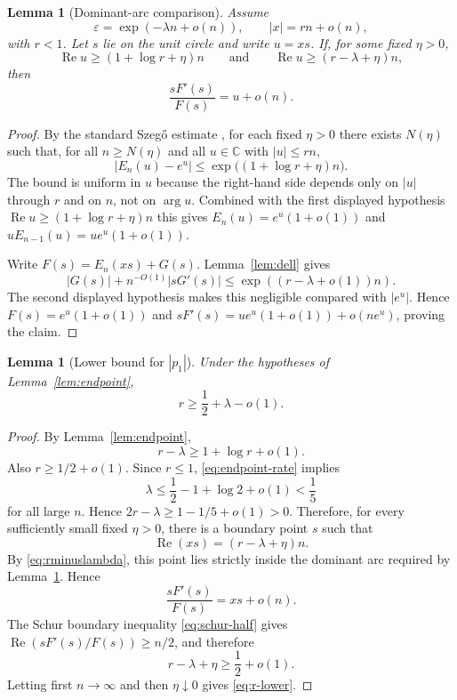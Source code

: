 \documentclass[11pt]{article}
\newtheorem{lemma}[theorem]{Lemma}
\newcommand{\C}{\mathbb{C}}
\newcommand{\eps}{\varepsilon}
\DeclareMathOperator{\Repart}{Re}
\begin{document}
\begin{lemma}[Dominant-arc comparison]\label{lem:dominant}
Assume
\[
        \eps=\exp(-\lambda n+o(n)),
        \qquad |x|=rn+o(n),
\]
with $r<1$.  Let $s$ lie on the unit circle and write $u=xs$.  If, for some
fixed $\eta>0$,
\[
        \Repart u\geq (1+\log r+\eta)n
        \qquad\text{and}\qquad
        \Repart u\geq (r-\lambda+\eta)n,
\]
then
\[
        \frac{sF'(s)}{F(s)}=u+o(n).
\]
\end{lemma}

\begin{proof}
By the standard Szeg\H{o} estimate \cite{Szego}, for each fixed $\eta>0$
there exists $N(\eta)$ such that, for all $n\geq N(\eta)$ and all $u\in\C$
with $|u|\leq rn$,
\[
        |E_n(u)-e^u|
        \leq \exp\!\bigl((1+\log r+\eta)n\bigr).
\]
The bound is uniform in $u$ because the right-hand side depends only on
$|u|$ through $r$ and on $n$, not on $\arg u$. Combined with the first
displayed hypothesis $\Repart u\geq(1+\log r+\eta)n$ this gives
$E_n(u)=e^u(1+o(1))$ and $uE_{n-1}(u)=ue^u(1+o(1))$.

Write $F(s)=E_n(xs)+G(s)$.  Lemma~\ref{lem:dell} gives
\[
        |G(s)|+n^{-O(1)}|sG'(s)|
        \leq \exp((r-\lambda+o(1))n).
\]
The second displayed hypothesis makes this negligible compared with
$|e^u|$.  Hence $F(s)=e^u(1+o(1))$ and
$sF'(s)=ue^u(1+o(1))+o(ne^u)$, proving the claim.
\end{proof}

\begin{lemma}[Lower bound for $|p_1|$]\label{lem:rlower}
Under the hypotheses of Lemma~\ref{lem:endpoint},
\[
        r\geq \frac12+\lambda-o(1).
        \tag{3.3}\label{eq:r-lower}
\]
\end{lemma}

\begin{proof}
By Lemma~\ref{lem:endpoint},
\[
        r-\lambda\geq 1+\log r+o(1).
        \tag{3.4}\label{eq:rminuslambda}
\]
Also \(r\geq1/2+o(1)\). Since \(r\leq1\), \eqref{eq:endpoint-rate} implies
\[
        \lambda\leq \frac12-1+\log 2+o(1)<\frac15
\]
for all large \(n\). Hence \(2r-\lambda\geq 1-1/5+o(1)>0\). Therefore, for
every sufficiently small fixed \(\eta>0\), there is a boundary point \(s\)
such that
\[
        \Repart(xs)=(r-\lambda+\eta)n.
\]
By \eqref{eq:rminuslambda}, this point lies strictly inside the dominant
arc required by Lemma~\ref{lem:dominant}. Hence
\[
        \frac{sF'(s)}{F(s)}=xs+o(n).
\]
The Schur boundary inequality \eqref{eq:schur-half} gives
\(\Repart(sF'(s)/F(s))\geq n/2\), and therefore
\[
        r-\lambda+\eta\geq \frac12+o(1).
\]
Letting first \(n\to\infty\) and then \(\eta\downarrow0\) gives
\eqref{eq:r-lower}.
\end{proof}
\end{document}
